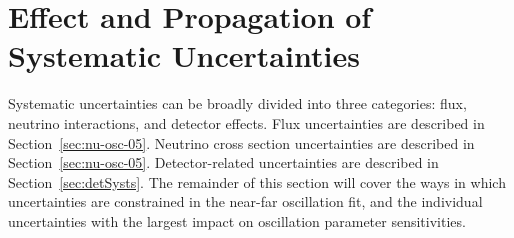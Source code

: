 \section{Effect and Propagation of Systematic Uncertainties}
\label{sec:physics-lbnosc-syst}\label{sec:nu-osc-09}



Systematic uncertainties can be broadly divided into three categories: flux, neutrino interactions, and detector effects. Flux uncertainties are described in Section~\ref{sec:nu-osc-05}. Neutrino cross section uncertainties are described in Section~\ref{sec:nu-osc-05}. Detector-related uncertainties are described in Section~\ref{sec:detSysts}. The remainder of this section will cover the ways in which uncertainties are constrained in the near-far oscillation fit, and the individual uncertainties with the largest impact on oscillation parameter sensitivities.

